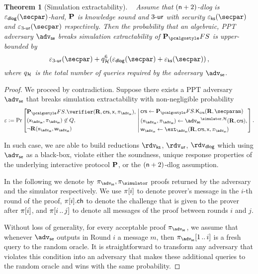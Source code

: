 \documentclass[runningheads,11pt]{llncs}
\newtheorem{theorem}{Theorem}%
\theoremstyle{definition}
\begin{document}
\begin{theorem}[Simulation extractability]
	~\newline{}
	Assume that $(\mathsf{n} + 2)$-dlog is $\eps_\dlog(\secpar)$-hard, $\mathbf{P}$ is knowledge sound and ${3\text{-}\mathsf{ur}}$ with security $\eps_{\ks}(\secpar)$ and $\eps_{\ur{3}}(\secpar)$ respectively. 
	Then the probability that an algebraic, PPT adversary $\advse$ breaks simulation extractability of $\plonkprotfs$ is upper-bounded by 
	\[
		\eps_{\ur{3}}(\secpar) + q_\ro^6 (\eps_{\dlog}(\secpar) + \eps_{\ks}(\secpar))\,,
	\]
	where $q_{\mathcal{H}}$ is the total number of queries required by the adversary $\advse$.
\end{theorem}
\begin{proof}
	We proceed by contradiction. Suppose there exists a PPT adversary $\advse$ that breaks simulation extractability with non-negligible probability
	\[
	\eps := \Pr
		\left[
		\begin{aligned}
			& \plonkprotfs.\verifier(\REL, \crs, \inp, \zkproof_{\advse}),\\
			& (\inp_{\advse}, \zkproof_{\advse}) \not\in Q,\\
			& \neg \REL(\inp_{\advse}, \wit_{\advse}) 
		\end{aligned}
		\,\left|\,
		\begin{aligned}
			& \crs \gets \plonkprotfs.\kcrs(\REL, \secparam)\\
			& (\inp_{\advse}, \zkproof_{\advse}) \gets \advse^{\simulator, \ro} (\REL, \crs),\\
			& \wit_{\advse} \gets \ext_{\advse}(\REL, \crs, \inp, \zkproof_{\advse})
		\end{aligned}
		\right.\right].
	\]

In such case, we are able to build reductions $\rdvks$, $\rdvur$, $\rdvdlog$ which using $\advse$ as a black-box, violate either the soundness, unique response properties of the underlying interactive protocol $\mathbf{P}$, or the $(\mathsf{n} + 2)$-dlog assumption.

In the following we denote by $\zkproof_{\advse}, \zkproof_{\simulator}$ proofs returned by the adversary and the simulator respectively. We use $\pi[i]$ to denote prover's message in the $i$-th round of the proof, $\pi[i].\mathsf{ch}$ to denote the challenge that is given to the prover after $\pi[i]$, and $\pi[i \, .. \, j]$ to denote all messages of the proof between rounds $i$ and $j$.

Without loss of generality, for every acceptable proof $\zkproof_{\advse}$, we assume that whenever $\advse$ outputs in Round $i$ a message $m$, then $\zkproof_{\advse}\range{1}{i}$ is a fresh query to the random oracle. 
It is straightforward to transform any adversary that violates this condition into an adversary that makes these additional queries to the random oracle and wins with the same probability.


\end{proof}
\end{document}
